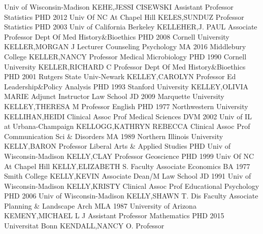 \documentclass[
]{article}
\begin{document}
Univ of Wisconsin-Madison \textbar KEHE,JESSI CISEWSKI \textbar{}
 \textbar Assistant Professor \textbar Statistics
\textbar PHD 2012 Univ Of NC At Chapel Hill \textbar KELES,SUNDUZ
\textbar{}  \textbar Professor \textbar Statistics
\textbar PHD 2003 Univ of California Berkeley \textbar KELLEHER,J. PAUL
\textbar{}  \textbar Associate Professor \textbar Dept Of
Med History\&Bioethics \textbar PHD 2008 Cornell University
\textbar KELLER,MORGAN J \textbar{}  \textbar Lecturer
\textbar Counseling Psychology \textbar MA 2016 Middlebury College
\textbar KELLER,NANCY \textbar{}  \textbar Professor
\textbar Medical Microbiology \textbar PHD 1990 Cornell University
\textbar KELLER,RICHARD C \textbar{}  \textbar Professor
\textbar Dept Of Med History\&Bioethics \textbar PHD 2001 Rutgers State
Univ-Newark \textbar KELLEY,CAROLYN \textbar{} 
\textbar Professor \textbar Ed Leadership\&Policy Analysis \textbar PHD
1993 Stanford University \textbar KELLEY,OLIVIA MARIE \textbar{}
 \textbar Adjunct Instructor \textbar Law School \textbar JD
2009 Marquette University \textbar KELLEY,THERESA M \textbar{}
 \textbar Professor \textbar English \textbar PHD 1977
Northwestern University \textbar KELLIHAN,HEIDI \textbar{} 
\textbar Clinical Assoc Prof \textbar Medical Sciences \textbar DVM 2002
Univ of IL at Urbana-Champaign \textbar KELLOGG,KATHRYN REBECCA
\textbar{}  \textbar Clinical Assoc Prof
\textbar Communication Sci \& Disorders \textbar MA 1989 Northern
Illinois University \textbar KELLY,BARON \textbar{} 
\textbar Professor \textbar Liberal Arts \& Applied Studies \textbar PHD
Univ of Wisconsin-Madison \textbar KELLY,CLAY \textbar{} 
\textbar Professor \textbar Geoscience \textbar PHD 1999 Univ Of NC At
Chapel Hill \textbar KELLY,ELIZABETH S. \textbar{} 
\textbar Faculty Associate \textbar Economics \textbar BA 1977 Smith
College \textbar KELLY,KEVIN \textbar{}  \textbar Associate
Dean/M \textbar Law School \textbar JD 1991 Univ of Wisconsin-Madison
\textbar KELLY,KRISTY \textbar{}  \textbar Clinical Assoc
Prof \textbar Educational Psychology \textbar PHD 2006 Univ of
Wisconsin-Madison \textbar KELLY,SHAWN T. \textbar{} 
\textbar Dis Faculty Associate \textbar Planning \& Landscape Arch
\textbar MLA 1987 University of Arizona \textbar KEMENY,MICHAEL L J
\textbar{}  \textbar Assistant Professor
\textbar Mathematics \textbar PHD 2015 Universitat Bonn
\textbar KENDALL,NANCY O. \textbar{}  \textbar Professor
\end{document}
